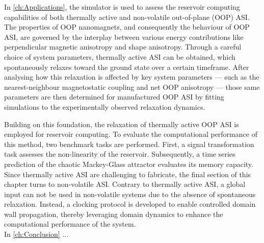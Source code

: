 In \cref{ch:Applications}, the \hotspice simulator is used to assess the reservoir computing capabilities of both thermally active and non-volatile out-of-plane (OOP) ASI.
The properties of OOP nanomagnets, and consequently the behaviour of OOP ASI, are governed by the interplay between various energy contributions like perpendicular magnetic anisotropy and shape anisotropy.
Through a careful choice of system parameters, thermally active ASI can be obtained, which spontaneously relaxes toward the ground state over a certain timeframe.
After analysing how this relaxation is affected by key system parameters --- such as the nearest-neighbour magnetostatic coupling and net OOP anisotropy --- those same parameters are then determined for manufactured OOP ASI by fitting simulations to the experimentally observed relaxation dynamics. \par
Building on this foundation, the relaxation of thermally active OOP ASI is employed for reservoir computing.
To evaluate the computational performance of this method, two benchmark tasks are performed.
First, a signal transformation task assesses the non-linearity of the reservoir.
Subsequently, a time series prediction of the chaotic Mackey-Glass attractor evaluates its memory capacity.
Since thermally active ASI are challenging to fabricate, the final section of this chapter turns to non-volatile ASI.
Contrary to thermally active ASI, a global input can not be used  in non-volatile systems due to the absence of spontaneous relaxation.
Instead, a clocking protocol is developed to enable controlled domain wall propagation, thereby leveraging domain dynamics to enhance the computational performance of the system. \\

In \cref{ch:Conclusion} ...
